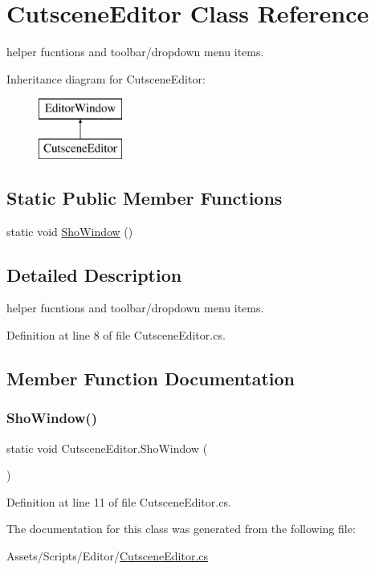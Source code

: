 \hypertarget{class_cutscene_editor}{}\section{Cutscene\+Editor Class Reference}
\label{class_cutscene_editor}


helper fucntions and toolbar/dropdown menu items.  


Inheritance diagram for Cutscene\+Editor\+:\begin{figure}[H]
\begin{center}
\leavevmode
\includegraphics[height=2.000000cm]{class_cutscene_editor}
\end{center}
\end{figure}
\subsection*{Static Public Member Functions}
\begin{DoxyCompactItemize}
\item 
static void \mbox{\hyperlink{class_cutscene_editor_a62458b36aa0ceb0359420afb33d3bc83}{Sho\+Window}} ()
\end{DoxyCompactItemize}


\subsection{Detailed Description}
helper fucntions and toolbar/dropdown menu items. 



Definition at line 8 of file Cutscene\+Editor.\+cs.



\subsection{Member Function Documentation}
\mbox{\label{class_cutscene_editor_a62458b36aa0ceb0359420afb33d3bc83}} 
\subsubsection{\texorpdfstring{Sho\+Window()}{ShoWindow()}}
{\footnotesize\ttfamily static void Cutscene\+Editor.\+Sho\+Window (\begin{DoxyParamCaption}{ }\end{DoxyParamCaption})\hspace{0.3cm}{\ttfamily [static]}}



Definition at line 11 of file Cutscene\+Editor.\+cs.



The documentation for this class was generated from the following file\+:\begin{DoxyCompactItemize}
\item 
Assets/\+Scripts/\+Editor/\mbox{\hyperlink{_cutscene_editor_8cs}{Cutscene\+Editor.\+cs}}\end{DoxyCompactItemize}
